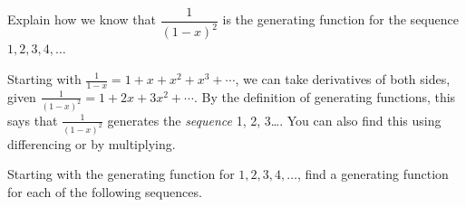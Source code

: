 \begin{questions}
\begin{answer}
	\end{answer}





\question Explain how we know that $\dfrac{1}{(1-x)^2}$ is the generating function for the sequence $1, 2, 3, 4, \ldots$

	\begin{answer}
		Starting with $\frac{1}{1-x} = 1 + x + x^2 + x^3 +\cdots$, we can take derivatives of both sides, given $\frac{1}{(1-x)^2} = 1 + 2x + 3x^2 + \cdots$.  By the definition of generating functions, this says that $\frac{1}{(1-x)^2}$ generates the {\em sequence} 1, 2, 3\ldots.  You can also find this using differencing or by multiplying.
	\end{answer}





\question Starting with the generating function for $1,2,3,4, \ldots$, find a generating function for each of the following sequences.


\end{questions}
